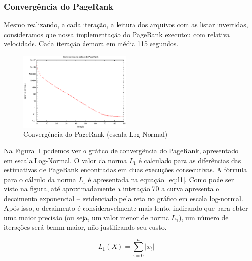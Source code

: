 \documentclass[10pt,twocolumn]{article}
\begin{document}
\subsubsection{Convergência do PageRank}

Mesmo realizando, a cada iteração, a leitura dos arquivos com as listar
invertidas, consideramos que nossa implementação do PageRank executou
com relativa velocidade. Cada iteração demora em média 115 segundos.

\begin{figure}[htb]
\begin{center}
\includegraphics[width=0.5\textwidth]{plot_pagerankconverge}
\end{center}
\caption{Convergência do PageRank (escala Log-Normal)}
\label{fig:converge}
\end{figure}

Na Figura~\ref{fig:converge} podemos ver o gráfico de convergência do
PageRank, apresentado em escala Log-Normal. O valor da norma \(L_1\) é
calculado para as diferências das estimativas de PageRank encontradas em
duas execuções consecutivas. A fórmula para o cálculo da norma \(L_1\) é
apresentada na equação~\ref{eq:l1}. Como pode ser visto na figura, até
aproximadamente a interação 70 a curva apresenta o decaimento
exponencial -- evidenciado pela reta no gráfico em escala
log-normal. Após isso, o decaimento é consideravelmente mais lento,
indicando que para obter uma maior precisão (ou seja, um valor menor de
norma \(L_1\)), um número de iterações será bemm maior, não justificando
seu custo.

\begin{equation}
L_1(X) = \sum_{i=0}^{n}|x_i|
\label{fig:li}
\end{equation}
\end{document}
